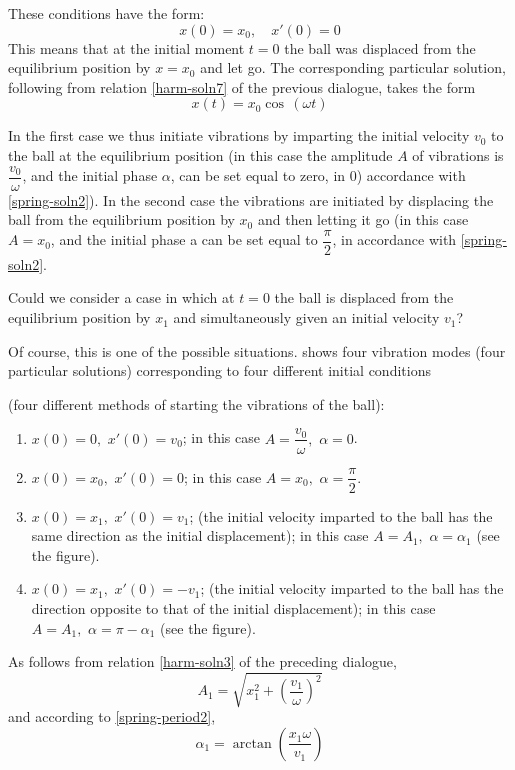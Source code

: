 \rdr These conditions have the form:
\begin{equation}%
x(0) = x_{0}, \quad x' (0) =0	
\label{spring-soln2}
\end{equation}
This means that at the initial moment $t = 0$ the ball was displaced from the equilibrium position by $x = x_{0}$ and let go. The corresponding particular solution, following from relation \eqref{harm-soln7} of the previous dialogue, takes the form
\begin{equation}%
x (t) = x_{0} \cos \, (\omega t)
\label{spring-soln2}
\end{equation}

\athr
\athr In the first case we thus initiate vibrations by imparting the initial velocity $v_{0}$ to the ball at the equilibrium position (in this case the amplitude $A$ of vibrations is $\dfrac{v_{0}}{\omega}$, and the initial phase $\alpha$, can be set equal to zero, in 0) accordance with \eqref{spring-soln2}). In the second case the vibrations are initiated by displacing the ball from the equilibrium position by $x_{0}$ and then letting it go (in this case $A= x_{0}$, and the initial phase a can be set equal to $\dfrac{\pi}{2}$, in accordance with \eqref{spring-soln2}. 

\rdr Could we consider a case in which at $t = 0$ the ball is displaced from the equilibrium position by $x_{1}$ and simultaneously given an initial velocity $v_{1}$?

\athr Of course, this is one of the possible situations.  shows four vibration modes (four particular solutions) corresponding to four different initial conditions

(four different methods of starting the vibrations of the ball):
\begin{enumerate}[label=\protect\circled{\arabic*}]
\item $x(0) =0, \,\, x' (0) = v_{0}$; in this case $A = \dfrac{v_{0}}{\omega}, \,\, \alpha = 0$.
\item $x(0) =x_{0}, \,\, x' (0) = 0$; in this case $A = x_{0}, \,\, \alpha = \dfrac{\pi}{2}$.
\item $x(0) =x_{1}, \,\, x' (0) = v_{1}$; (the initial velocity imparted to the ball has the same direction as the initial displacement); in this case $A = A_{1}, \,\, \alpha = \alpha_{1}$ (see the figure).
 \item $x(0) =x_{1}, \,\, x' (0) = -v_{1}$; (the initial velocity imparted to the ball has the direction opposite to that of the initial displacement); in this case $A = A_{1}, \,\, \alpha = \pi - \alpha_{1}$ (see the figure).
\end{enumerate}
As follows from relation \eqref{harm-soln3} of the preceding dialogue,
\begin{equation}%
 A_{1} = \sqrt{ x_{1}^{2} + \left( \dfrac{v_{1}}{\omega} \right)^{2}}
\label{spring-soln3}
\end{equation}
and according to \eqref{spring-period2},
\begin{equation}%
 \alpha_{1} = \arctan \left( \dfrac{x_{1} \omega}{v_{1}} \right)
\label{spring-soln4}
\end{equation}

